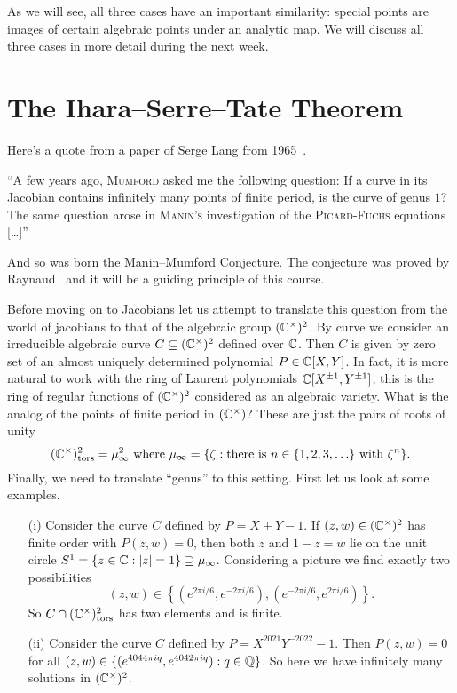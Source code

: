 As we will see, all three cases have an important similarity: special
points are images of certain algebraic points under an analytic map.
We will discuss all three cases in more detail during the next week. 

\section{The Ihara--Serre--Tate Theorem}

Here's a quote from a paper of Serge Lang from
1965~\cite{Lang:Division}.

\begin{displayquote}
  ``A few years ago, \textsc{Mumford} asked me the following question:
  If a curve in its Jacobian contains infinitely many points of finite
  period, is the curve of genus $1$? The same question arose in
  \textsc{Manin's} investigation of the \textsc{Picard-Fuchs}
  equations [\ldots]''
\end{displayquote}
And so was born the Manin--Mumford Conjecture. The conjecture was
proved by Raynaud~\cite{Raynaud:MM} and it will be a guiding principle of this
course. 

Before moving on to Jacobians let us attempt to translate this question
from the world of jacobians to that  of the algebraic group $({\mathbb{C}}^\times)^2$. By
curve we consider an irreducible algebraic curve $C\subseteq
({\mathbb{C}}^\times)^2$ defined over ${\mathbb{C}}$. Then $C$ is given by zero set of
an almost uniquely determined polynomial $P\in {\mathbb{C}}[X,Y]$.
In fact, it is more natural to work with the ring of
Laurent polynomials ${\mathbb{C}}[X^{\pm 1},Y^{\pm 1}]$, this is the ring of
regular functions of $({\mathbb{C}}^\times)^2$ considered as an algebraic
variety.
What is the analog of the points of finite period in $({\mathbb{C}}^\times)$?
These are just the pairs of roots of unity
$$ ({\mathbb{C}}^\times)^2_{\mathrm{tors}}= \mu_\infty^2  \text{ where
}\mu_\infty = \{\zeta : \text{there is $n\in\{1,2,3,\ldots\}$
  with }\zeta^n \}.$$
Finally, we need to translate ``genus'' to this setting. First let us
look at some examples.

\begin{example}
  \begin{itemize}
  \item [(i)] Consider the curve $C$ defined by $P = X+Y-1$. If
    $(z,w)\in({\mathbb{C}}^\times)^2$ has finite order with $P(z,w)=0$, then
    both $z$ and $1-z=w$ lie on the unit circle $S^1= \{z\in{\mathbb{C}} :
    |z|=1\}\supseteq\mu_\infty$. 
    Considering a picture we find exactly two possibilities    
    $$
    (z,w) \in \left\{ (e^{2\pi i/6},e^{-2\pi i/6}),(e^{-2\pi
        i/6},e^{2\pi i/6})\right\}.
    $$
    So $C\cap ({\mathbb{C}}^\times)^2_{\mathrm{tors}}$ has two elements and is
    finite.

  \item[(ii)] Consider the curve $C$ defined by
    $P=X^{2021}Y^{-2022}-1$. Then
    $P(z,w)=0$ for all $(z,w)\in \{(e^{4044\pi iq},e^{4042\pi i
      q}) : q\in{\mathbb{Q}}\}$.
    So here we have infinitely many solutions in $({\mathbb{C}}^\times)^2$.
  \end{itemize}
\end{example}


